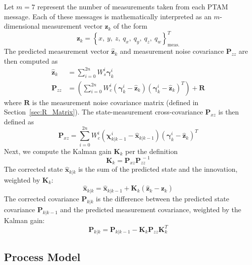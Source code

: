 Let $m = 7$ represent the number of measurements taken from each PTAM message. Each of these messages is mathematically interpreted as an $m$-dimensional measurement vector $\mathbf{z}_{k}$ of the form
%
\begin{equation}
\mathbf{z}_{k} = \left\lbrace x,\ y,\ z,\ q_{x},\ q_{y},\ q_{z},\ q_{w} \right\rbrace ^{T} _{\text{meas.}} 
\end{equation}
%
The predicted measurement vector $\hat{\mathbf{z}}_{k}$ and measurement noise covariance $\mathbf{P}_{zz}$ are then computed as
%
\begin{align}
\hat{\mathbf{z}}_{k} &= \sum^{2n}_{i=0} W^{i}_{s} \bm{\gamma}^{i}_{k} \label{eq:zHat} \\
\mathbf{P}_{zz} &= \left( \sum^{2n}_{i=0} W^{i}_{c} \left( \bm{\gamma}^{i}_{k} - \hat{\mathbf{z}}_{k} \right) \left( \bm{\gamma}^{i}_{k} - \hat{\mathbf{z}}_{k} \right)^{T} \right) + \mathbf{R} \label{eq:P_zz}
\end{align}
%
where $\mathbf{R}$ is the measurement noise covariance matrix (defined in Section~\ref{sec:R_Matrix}). The state-measurement cross-covariance $\mathbf{P}_{xz}$ is then defined as
%
\begin{equation} \label{eq:P_xz}
\mathbf{P}_{xz} = \sum^{2n}_{i=0} W^{i}_{c} \left( \bm{\chi}^{i}_{k | k-1} - \hat{\mathbf{x}}_{k | k-1} \right) \left( \bm{\gamma}^{i}_{k} - \hat{\mathbf{z}}_{k} \right)^{T}
\end{equation}
%
Next, we compute the Kalman gain $\mathbf{K}_{k}$ per the definition
%
\begin{equation}
\mathbf{K}_{k} = \mathbf{P}_{xz} \mathbf{P}^{\,-1}_{zz}
\end{equation}
%
The corrected state $\hat{\mathbf{x}}_{k | k}$ is the sum of the predicted state and the innovation, weighted by $\mathbf{K}_{k}$:
%
\begin{equation}
\hat{\mathbf{x}}_{k | k} = \hat{\mathbf{x}}_{k | k-1} + \mathbf{K}_{k} \left( \hat{\mathbf{z}}_{k} - \mathbf{z}_{k} \right)
\end{equation}
%
The corrected covariance $\mathbf{P}_{k | k}$ is the difference between the predicted state covariance $\mathbf{P}_{k | k-1}$ and the predicted measurement covariance, weighted by the Kalman gain:
%
\begin{equation}
\mathbf{P}_{k | k} = \mathbf{P}_{k | k-1} - \mathbf{K}_{k} \mathbf{P}_{zz} \mathbf{K}_{k}^{T}
\end{equation}

\subsection{Process Model} \label{Process_Model}

